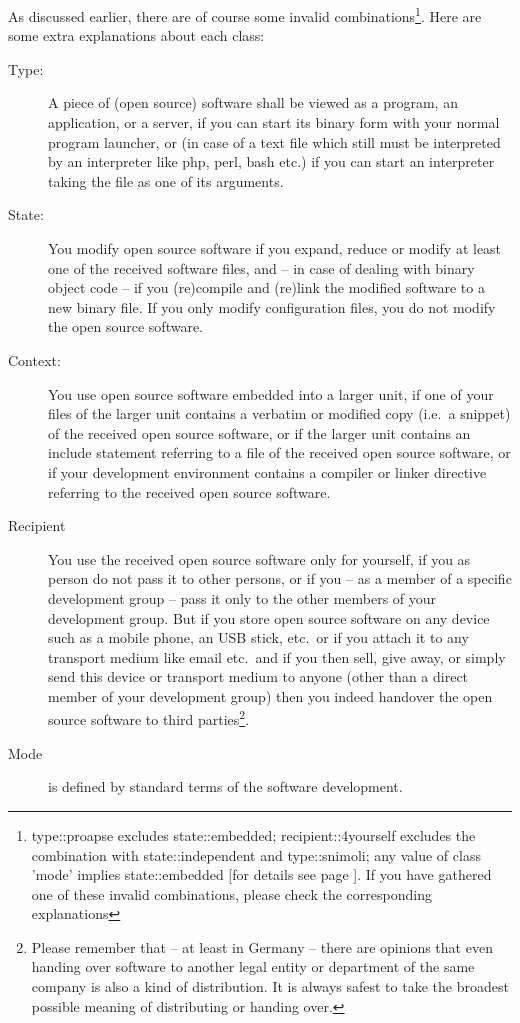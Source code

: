 As discussed earlier, there are of course some invalid
combinations\footnote{type::proapse excludes state::embedded;
recipient::4yourself excludes the combination with state::independent and
type::snimoli; any value of class 'mode' implies state::embedded [for details
see page \pageref{InvalidFinderTokenCombinations}]. If you have gathered one of
these invalid combinations, please check the corresponding explanations}. Here
are some extra explanations about each class:

\begin{description}
\item[Type:] A piece of (open source) software shall be viewed as a program, an
application, or a server, if you can start its binary form with your normal
program launcher, or (in case of a text file which still must be interpreted by
an interpreter like php, perl, bash etc.) if you can start an interpreter taking
the file as one of its arguments. \item[State:] You modify open source software
if you expand, reduce or modify at least one of the received software files, and
-- in case of dealing with binary object code -- if you (re)compile and (re)link
the modified software to a new binary file. If you only modify configuration
files, you do not modify the open source software.
\item[Context:] You use open source software embedded into a larger unit, if one
of your files of the larger unit contains a verbatim or modified copy (i.e.\ a
snippet) of the received open source software, or if the larger unit contains an
include statement referring to a file of the received open source software, or
if your development environment contains a compiler or linker directive
referring to the received open source software.
\item[Recipient] You use the received open source software only for yourself, if
you as person do not pass it to other persons, or if you -- as a member of a
specific development group -- pass it only to the other members of your
development group. But if you store open source software on any device such as a
mobile phone, an USB stick, etc.\ or if you attach it to any transport
medium like email etc.\ and if you then sell, give away, or simply send this
device or transport medium to anyone (other than a direct member
of your development group) then you indeed handover the open source software to
third parties\footnote{Please remember that -- at least in Germany -- there are
opinions that even handing over software to another legal entity or department
of the same company is also a kind of distribution. It is always safest
to take the broadest possible meaning of distributing or handing over.}.
\item[Mode] is defined by standard terms of the software development.
\end{description}

